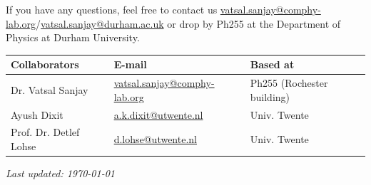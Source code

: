 \documentclass[11pt]{article}
\begin{document}
If you have any questions, feel free to contact us \href{mailto:vatsal.sanjay@comphy-lab.org}{vatsal.sanjay@comphy-lab.org}/\href{mailto:vatsal.sanjay@durham.ac.uk}{vatsal.sanjay@durham.ac.uk} or drop by Ph255 at the Department of Physics at Durham University.
\begin{center}
\begin{tabular}{|l|l|l|}
\hline \textbf{Collaborators} & \textbf{E-mail} & \textbf{Based at} \\
\hline Dr. Vatsal Sanjay & \href{mailto:vatsal.sanjay@comphy-lab.org}{vatsal.sanjay@comphy-lab.org} & Ph255 (Rochester building) \\
\hline Ayush Dixit & \href{mailto:a.k.dixit@utwente.nl}{a.k.dixit@utwente.nl} & Univ. Twente \\
\hline Prof. Dr. Detlef Lohse & \href{mailto:d.lohse@utwente.nl}{d.lohse@utwente.nl} & Univ. Twente  \\
\hline
\end{tabular}
\end{center}

\vspace{1em}
\noindent\textit{Last updated: \today}

\printbibliography
\end{document}
